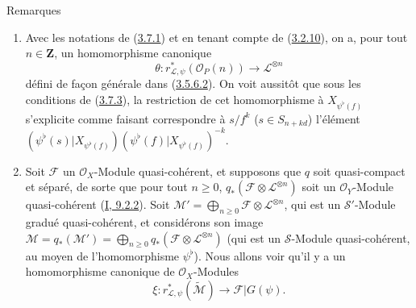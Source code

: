 \begin{namedtheorem}[3.7.9]{Remarques}
\label{II.3.7.9-fr}
\begin{enumerate}
  \item[(i)] Avec les notations de (\hyperref[II.3.7.1-fr]{3.7.1}) et en
    tenant compte de (\hyperref[II.3.2.10-fr]{3.2.10}), on a, pour tout
    $n\in\mathbf{Z}$, un homomorphisme canonique
    \[
    \label{II.3.7.9.1-fr}
      \theta:r_{\mathcal{L},\psi}^*(\mathcal{O}_P(n))\longrightarrow
      \mathcal{L}^{\otimes n}
    \tag{3.7.9.1}
    \]
    défini de façon générale dans
    (\hyperref[II.3.5.6.2-fr]{3.5.6.2}). On voit aussitôt que sous les
    conditions de (\hyperref[II.3.7.3-fr]{3.7.3}), la restriction de cet
    homomorphisme à $X_{\psi^\flat(f)}$ s'explicite comme faisant
    correspondre à $s/f^k$ ($s\in S_{n+kd}$) l'élément
    $(\psi^\flat(s)|X_{\psi^\flat(f)})
    (\psi^\flat(f)|X_{\psi^\flat(f)})^{-k}$.
  \item[(ii)] Soit $\mathcal{F}$ un $\mathcal{O}_X$-Module quasi-cohérent, et
    supposons que $q$ soit quasi-compact et séparé, de sorte que pour tout
    $n\geq0$, $q_*(\mathcal{F}\otimes\mathcal{L}^{\otimes n})$ soit un
    $\mathcal{O}_Y$-Module quasi-cohérent
    (\hyperref[I.9.2.2-fr]{I, 9.2.2}). Soit
    $\mathcal{M}'=\bigoplus_{n\geq0}\mathcal{F}\otimes
    \mathcal{L}^{\otimes n}$, qui est un $\mathcal{S}'$-Module gradué
    quasi-cohérent, et considérons son image
    $\mathcal{M}=q_*(\mathcal{M}')=
    \bigoplus_{n\geq0}q_*(\mathcal{F}\otimes\mathcal{L}^{\otimes n})$
    (qui est un $\mathcal{S}$-Module quasi-cohérent, au moyen de
    l'homomorphisme $\psi^\flat$). Nous allons voir qu'il y a un
    homomorphisme canonique de $\mathcal{O}_X$-Modules
    \[
    \label{II.3.7.9.2-fr}
      \xi:r_{\mathcal{L},\psi}^*(\widetilde{\mathcal{M}})
      \longrightarrow\mathcal{F}|G(\psi).
    \tag{3.7.9.2}
    \]


\end{enumerate}
\end{namedtheorem}
